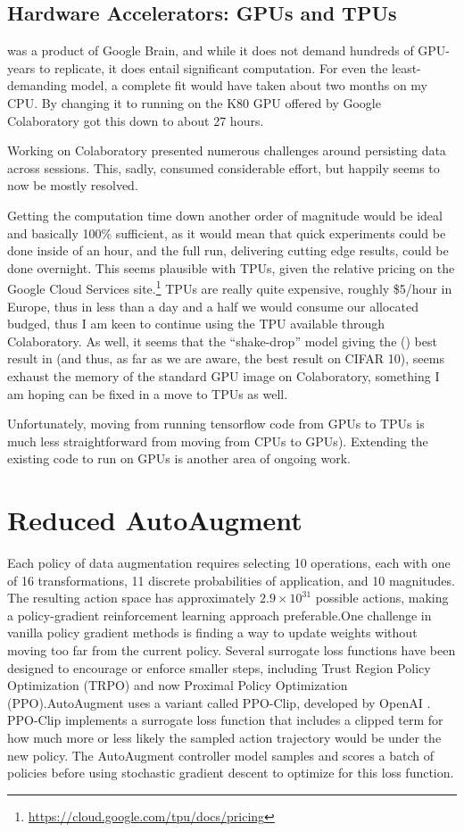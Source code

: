 \documentclass[10pt,twocolumn,letterpaper]{article}
\begin{document}
\subsection{Hardware Accelerators: GPUs and TPUs}
\cite{Cubuk2018} was a product of Google Brain, and while it does not demand hundreds of GPU-years to replicate, it does entail significant computation. For even the least-demanding model, a complete fit would have taken about two months on my CPU. By changing it to running on the K80 GPU offered by Google Colaboratory got this down to about 27 hours. 

Working on Colaboratory presented numerous challenges around persisting data across sessions. This, sadly, consumed considerable effort, but happily seems to now be mostly resolved. 

Getting the computation time down another order of magnitude would be ideal and basically 100\% sufficient, as it would mean that quick experiments could be done inside of an hour, and the full run, delivering cutting edge results, could be done overnight. This seems plausible with TPUs, given the relative pricing on the Google Cloud Services site.\footnote{\url{https://cloud.google.com/tpu/docs/pricing}} TPUs are really quite expensive, roughly \$5/hour in Europe, thus in less than a day and a half we would consume our allocated budged, thus I am keen to continue using the TPU available through Colaboratory. As well, it seems that the ``shake-drop'' model giving the (\cite{Yamada2018}) best result in \cite{Cubuk2018} (and thus, as far as we are aware, the best result on CIFAR 10), seems exhaust the memory of the standard GPU image on Colaboratory, something I am hoping can be fixed in a move to TPUs as well. 

Unfortunately, moving from running tensorflow code from GPUs to TPUs is much less straightforward from moving from CPUs to GPUs). Extending the existing code to run on GPUs is another area of ongoing work.

\section{Reduced AutoAugment}

	Each policy of data augmentation requires selecting 10 operations, each with one of 16 transformations, 11 discrete probabilities of application, and 10 magnitudes.  The resulting action space has approximately $2.9 \times 10^{31}$ possible actions, making a policy-gradient reinforcement learning approach preferable.One challenge in vanilla policy gradient methods is finding a way to update weights without moving too far from the current policy. Several surrogate loss functions have been designed to encourage or enforce smaller steps, including Trust Region Policy Optimization (TRPO) and now Proximal Policy Optimization (PPO).AutoAugment uses a variant called PPO-Clip, developed by OpenAI \cite{Schulman2017}. PPO-Clip implements a surrogate loss function that includes a clipped term for how much more or less likely the sampled action trajectory would be under the new policy. The AutoAugment controller model samples and scores a batch of policies before using stochastic gradient descent to optimize for this loss function.
	
\end{document}
